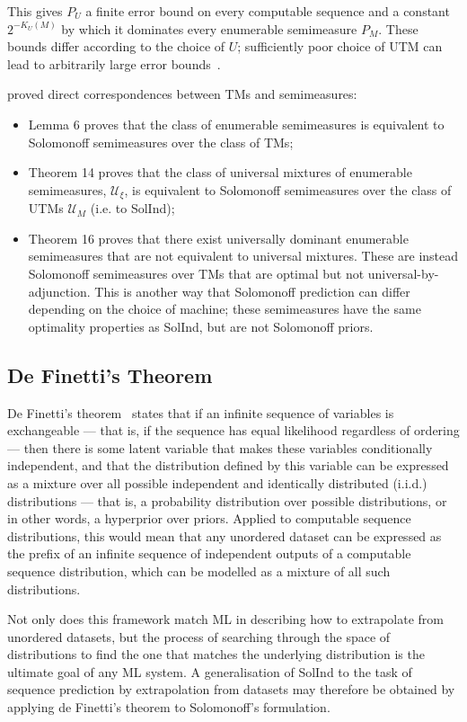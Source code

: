 \documentclass[11pt]{article}
\begin{document}
This gives $P_U$ a finite error bound on every computable sequence and a constant $2^{-K_U(M)}$ by which it dominates every enumerable semimeasure $P_M$.
These bounds differ according to the choice of $U$; sufficiently poor choice of UTM can lead to arbitrarily large error bounds~\citep{Leike2015}.

\citet{Wood2013} proved direct correspondences between TMs and semimeasures:
\begin{itemize}
\item Lemma 6 proves that the class of enumerable semimeasures is equivalent to Solomonoff semimeasures over the class of TMs;
\item Theorem 14 proves that the class of universal mixtures of enumerable semimeasures, $\mathcal{U}_\xi$, is equivalent to Solomonoff semimeasures over the class of UTMs $\mathcal{U}_M$ (i.e. to SolInd);
\item Theorem 16 proves that there exist universally dominant enumerable semimeasures that are not equivalent to universal mixtures. These are instead Solomonoff semimeasures over TMs that are optimal but not universal-by-adjunction. This is another way that Solomonoff prediction can differ depending on the choice of machine; these semimeasures have the same optimality properties as SolInd, but are not Solomonoff priors.
\end{itemize}



\subsection{De Finetti's Theorem}

De Finetti's theorem~\citep{deFinetti1931}
states that if an infinite sequence of variables is exchangeable --- that is, if the sequence has equal likelihood regardless of ordering --- then there is some latent variable that makes these variables conditionally independent, and that the distribution defined by this variable can be expressed as a mixture over all possible independent and identically distributed (i.i.d.) distributions --- that is, a probability distribution over possible distributions, or in other words, a hyperprior over priors.
Applied to computable sequence distributions, this would mean that any unordered dataset can be expressed as the prefix of an infinite sequence of independent outputs of a computable sequence distribution,
which can be modelled as a mixture of all such distributions.

Not only does this framework match ML in describing how to extrapolate from unordered datasets, but the process of searching through the space of distributions to find the one that matches the underlying distribution is the ultimate goal of any ML system.
A generalisation of SolInd to the task of sequence prediction by extrapolation from datasets may therefore be obtained by applying de Finetti's theorem to Solomonoff's formulation.
\end{document}
